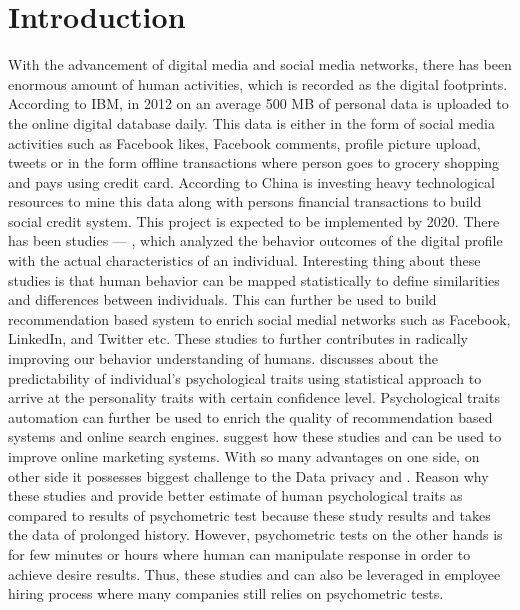 \documentclass[sigconf]{acmart}
\begin{document}
\section{Introduction}
With the advancement of digital media and social media networks, there has been enormous amount of human activities, which is recorded as the digital footprints.
 According to IBM, in 2012 on an average 500 MB of personal data is uploaded to the online digital database daily. This data is either in the form of social media 
 activities such as Facebook likes, Facebook comments, profile picture upload, tweets or in the form offline transactions where person goes to grocery shopping 
 and pays using credit card. According to \cite{ref1} China is investing heavy technological resources to mine this data along with person\textquotesingle s financial transactions to
 build social credit system. This project is expected to be implemented by 2020. There has been studies \cite{ref2} --- \cite{ref7}, which analyzed the behavior outcomes of 
 the digital profile with the actual characteristics of an individual. Interesting thing about these studies is that human behavior can be mapped statistically
 to define similarities and differences between individuals. This can further be used to build recommendation based system to enrich social medial networks such 
 as Facebook, LinkedIn, and Twitter etc. These studies \cite{ref2} to \cite{ref7} further contributes in radically improving our behavior understanding of humans.
 \cite{ref4} discusses about the predictability of individual’s psychological traits using statistical approach to arrive at the personality traits with certain confidence
 level. Psychological traits automation can further be used to enrich the quality of recommendation based systems and online search engines. \cite{ref8} suggest how these
 studies \cite{ref2} and \cite{ref7} can be used to improve online marketing systems.  With so many advantages on one side, on other side it possesses biggest challenge to the
 Data privacy \cite{ref9} and \cite{ref10}.  Reason why these studies \cite{ref2} and \cite{ref7} provide better estimate of human psychological traits as compared to results of psychometric test
 because these study results \cite{ref2} and \cite{ref7} takes the data of prolonged history. However, psychometric tests on the other hands  is for few minutes or hours where
 human can manipulate response in order to achieve desire results. Thus, these studies \cite{ref2} and \cite{ref7} can also be leveraged in employee hiring process where many
 companies still relies on psychometric tests. 
\end{document}
